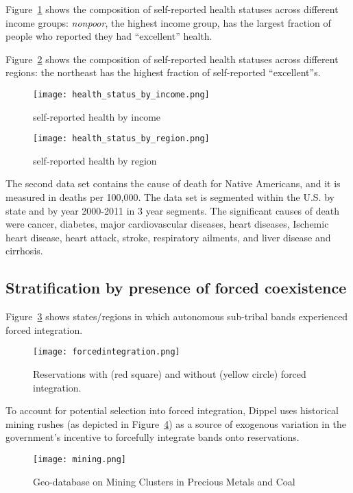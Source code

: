 \documentclass[12pt]{article}
\begin{document}
Figure~\ref{fig:health_status_by_income} shows the composition of self-reported health statuses across different income groups: \emph{nonpoor}, the highest income group, has the largest fraction of people who reported they had ``excellent'' health.

Figure~\ref{fig:health_status_by_region} shows the composition of self-reported health statuses across different regions: the northeast has the highest fraction of self-reported ``excellent''s.

\begin{figure}[ht!]
\centering
\texttt{[image: health\_status\_by\_income.png]}
\caption{self-reported health by income}
\label{fig:health_status_by_income}
\end{figure}

\begin{figure}[ht!]
\centering
\texttt{[image: health\_status\_by\_region.png]}
\caption{self-reported health by region}
\label{fig:health_status_by_region}
\end{figure}

The second data set contains the cause of death for Native Americans, and it is measured in deaths per 100,000.  The data set is segmented within the U.S. by state and by year 2000-2011 in 3 year segments.  The significant causes of death were cancer, diabetes, major cardiovascular diseases, heart diseases, Ischemic heart disease, heart attack, stroke, respiratory ailments, and liver disease and cirrhosis.

\subsection{Stratification by presence of forced coexistence}
Figure~\ref{fig:reservations} shows states/regions in which autonomous sub-tribal bands experienced forced integration. 

\begin{figure}[ht!]
\centering
\texttt{[image: forcedintegration.png]}
\caption{Reservations with (red square) and without (yellow circle) forced integration.}
\label{fig:reservations}
\end{figure}

To account for potential selection into forced integration, Dippel uses historical mining rushes (as depicted in Figure~\ref{fig:mining}) as a source of exogenous variation in the government's incentive to forcefully integrate bands onto reservations. 

\begin{figure}[ht!]
\centering
\texttt{[image: mining.png]}
\caption{Geo-database on Mining Clusters in Precious Metals and Coal}
\label{fig:mining}
\end{figure}
\end{document}
